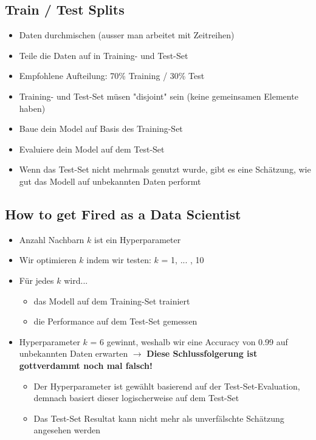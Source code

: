 \documentclass[a4paper]{article}
\begin{document}
		\subsection{Train / Test Splits}
		
		\begin{itemize}
			\item Daten durchmischen (ausser man arbeitet mit Zeitreihen)
			\item Teile die Daten auf in Training- und Test-Set
			\item Empfohlene Aufteilung: 70\% Training / 30\% Test
			\item Training- und Test-Set müsen "disjoint" sein (keine gemeinsamen Elemente haben)
			\item Baue dein Model auf Basis des Training-Set
			\item Evaluiere dein Model auf dem Test-Set
			\item Wenn das Test-Set nicht mehrmals genutzt wurde, gibt es eine Schätzung, wie gut das Modell auf unbekannten Daten performt
		\end{itemize}
	
		\subsection{How to get Fired as a Data Scientist}
		
		\begin{itemize}
			\item Anzahl Nachbarn $k$ ist ein Hyperparameter
			\item Wir optimieren $k$ indem wir testen: $k$ = 1, ... , 10
			\item Für jedes $k$ wird...
			\begin{itemize}
				\item das Modell auf dem Training-Set trainiert
				\item die Performance auf dem Test-Set gemessen
			\end{itemize}
			\item Hyperparameter $k$ = 6 gewinnt, weshalb wir eine Accuracy von 0.99 auf unbekannten Daten erwarten
				$\rightarrow$ \textbf{Diese Schlussfolgerung ist gottverdammt noch mal falsch!}
				\begin{itemize}
					\item Der Hyperparameter ist gewählt basierend auf der Test-Set-Evaluation, demnach basiert dieser logischerweise auf dem Test-Set
					\item Das Test-Set Resultat kann nicht mehr als unverfälschte Schätzung angesehen werden
				\end{itemize}
		\end{itemize}
	
\end{document}
